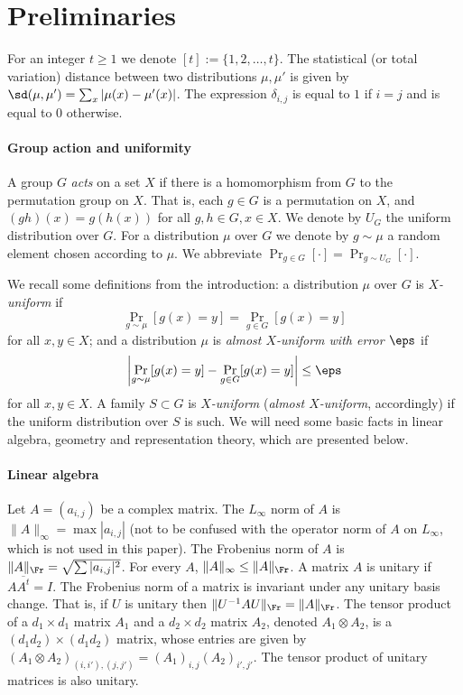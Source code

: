 \section{Preliminaries}
\label{sec:prelim}

For an integer $t \ge 1$ we denote $[t]:=\{1,2,\ldots,t\}$. The statistical (or total variation) distance between two distributions $\mu,\mu'$ is
given by $\sd(\mu,\mu')=\sum_{x} |\mu(x)-\mu'(x)|$. The expression $\delta_{i,j}$ is equal to $1$ if $i=j$ and is equal to $0$ otherwise.



\paragraph{Group action and uniformity}
A group $G$ \emph{acts} on a set $X$ if there is a homomorphism from $G$ to the
permutation group on $X$. That is, each $g \in G$ is a permutation on $X$,
and $(gh)(x)=g(h(x))$ for all $g,h \in G, x \in X$. We denote by $U_G$
the uniform distribution over $G$. For a distribution $\mu$ over $G$ we denote
by $g \sim \mu$ a random element chosen according to $\mu$. We abbreviate $\Pr_{g \in G}[\cdot] = \Pr_{g \sim U_G}[\cdot]$.

We recall some definitions from the
introduction: a distribution $\mu$ over $G$ is \emph{$X$-uniform} if
$$
\Pr_{g \sim \mu}[g(x)=y] = \Pr_{g \in G}[g(x)=y]
$$
for all $x,y \in X$; and a distribution $\mu$ is
\emph{almost $X$-uniform with error $\eps$} if
$$
\left| \Pr_{g \sim \mu}[g(x)=y] -
\Pr_{g \in G}[g(x)=y] \right| \le \eps
$$
for all $x,y \in X$. A family $S \subset G$ is \emph{$X$-uniform} (\emph{almost
$X$-uniform}, accordingly) if the uniform distribution over $S$ is such. We will need
some basic facts in linear algebra, geometry and representation theory,
which are presented below.

\paragraph{Linear algebra}
Let $A=(a_{i,j})$ be a complex matrix. The $L_{\infty}$ norm of $A$ is $\|A\|_{\infty}=\max
|a_{i,j}|$ (not to be confused with the operator norm of $A$ on $L_{\infty}$, which is not used in this paper).
The Frobenius norm of $A$ is $\|A\|_{\Fr} = \sqrt{\sum
|a_{i,j}|^2}$. For every $A$, $\|A\|_{\infty} \le \|A\|_{\Fr}$. A matrix
$A$ is unitary if $A \overline{A^t} = I$. The Frobenius
norm of a matrix is invariant under any unitary
basis change. That is, if $U$
is unitary then $\|U^{-1} A U\|_{\Fr} = \|A\|_{\Fr}$. The tensor product
of a $d_1 \times d_1$ matrix $A_1$ and a $d_2 \times d_2$ matrix $A_2$,
denoted $A_1 \otimes A_2$, is a $(d_1 d_2) \times (d_1 d_2)$ matrix, whose
entries are given by $(A_1 \otimes A_2)_{(i,i'),(j,j')} = (A_1)_{i,j}
(A_2)_{i',j'}$. The tensor product of unitary matrices is
also unitary.

